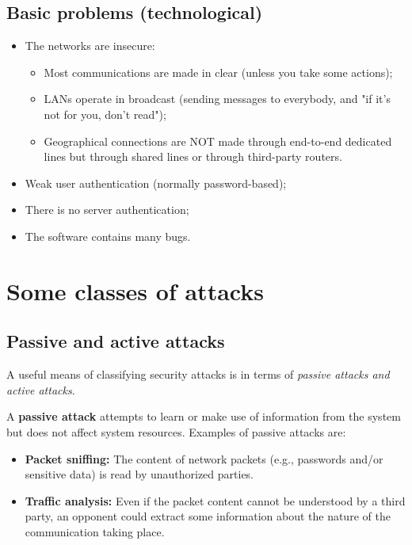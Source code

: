 \subsection{Basic problems (technological)}
\begin{itemize}
	\item The networks are insecure:
	      \begin{itemize}
		      \item Most communications are made in clear (unless you take some actions);
		      \item LANs operate in broadcast (sending messages to everybody, and "if it's not for you, don't read");
		      \item Geographical connections are NOT made through end-to-end dedicated lines but through shared lines or through third-party routers.
	      \end{itemize}
	\item Weak user authentication (normally password-based);
	\item There is no server authentication;
	\item The software contains many bugs.
\end{itemize}


\section{Some classes of attacks}

\subsection{Passive and active attacks}
A useful means of classifying security attacks is in terms of \emph{passive attacks and active attacks}.

A \textbf{passive attack} attempts to {learn or make use of information from the system but does not affect system resources}. Examples of passive attacks are:

\begin{itemize}
	\item \textbf{Packet sniffing:} The content of network packets (e.g., passwords and/or sensitive data) is read by unauthorized parties.
	\item \textbf{Traffic analysis:} Even if the packet content cannot be understood by a third party, an opponent could extract some information about the nature of the communication taking place.
\end{itemize}

